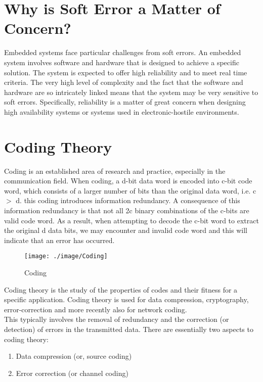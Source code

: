 \documentclass[12pt,a4paper]{report}
\begin{document}
 \section{Why is Soft Error a Matter of Concern?}
 Embedded systems face particular challenges from soft errors. An embedded system involves software and hardware that is designed to achieve a specific solution. The system is expected to offer high reliability and to meet real time criteria. The very high level of complexity and the fact that the software and hardware are so intricately linked means that the system may be very sensitive to soft errors. Specifically, reliability is a matter of great concern when designing high availability systems or systems used in electronic-hostile environments.
 
 \section{Coding Theory}
 Coding is an established area of research and practice, especially in the communication field. When coding, a d-bit data word is encoded into c-bit code word, which consists of a larger number of bits than the original data word, i.e. c $>$ d. this coding introduces information redundancy. A consequence of this information redundancy is that not all 2c binary combinations of the c-bits are valid code word. As a result, when attempting to decode the c-bit word to extract the original d data bits, we may encounter and invalid code word and this will indicate that an error has occurred.\\
 
\begin{figure}
 \texttt{[image: ./image/Coding]}
 \caption{Coding}
 \label{fig:Coding}
\end{figure}
 
 Coding theory is the study of the properties of codes and their fitness for a specific application. Coding theory is used for data compression, cryptography, error-correction and more recently also for network coding.\\
 
 This typically involves the removal of redundancy and the correction (or detection) of errors in the transmitted data. There are essentially two aspects to coding theory:\\
 
 \begin{enumerate}
 \item Data compression (or, source coding)
 \item Error correction (or channel coding)
 \end{enumerate}
\end{document}
